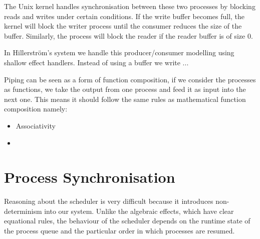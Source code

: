 \documentclass[logo,bsc,singlespacing,parskip]{infthesis}
\begin{document}
The Unix kernel handles synchronisation between these two processes by blocking reads and writes under certain conditions. If the write buffer becomes full, the kernel will block the writer process until the consumer reduces the size of the buffer. Similarly, the process will block the reader if the reader buffer is of size 0.

In Hillerström's system we handle this producer/consumer modelling using shallow effect handlers. Instead of using a buffer we write ...

Piping can be seen as a form of function composition, if we consider the processes as functions, we take the output from one process and feed it as input into the next one. This means it should follow the same rules as mathematical function composition namely:
\begin{itemize}
    \item Associativity
    \item 
\end{itemize}


\section*{Process Synchronisation}
Reasoning about the scheduler is very difficult because it introduces non-determinism into our system. Unlike the algebraic effects, which have clear equational rules, the behaviour of the scheduler depends on the runtime state of the process queue and the particular order in which processes are resumed. 
\end{document}
